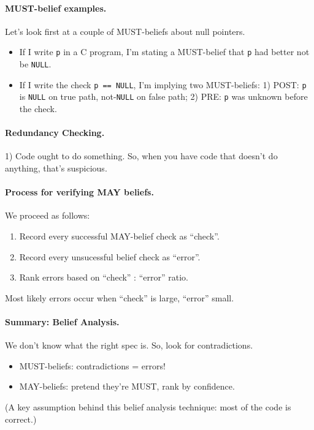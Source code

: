 \documentclass[11pt]{article}
\begin{document}
\paragraph{MUST-belief examples.} Let's look first at a couple of
MUST-beliefs about null pointers.

\begin{itemize}[noitemsep]
\item If I write {\tt *p} in a C program, I'm stating a MUST-belief that
  {\tt p} had better not be {\tt NULL}.
\item If I write the check {\tt p == NULL}, I'm implying two MUST-beliefs:
  1) POST: {\tt p} is {\tt NULL} on true path, not-{\tt NULL} on false path; 2) PRE:
  {\tt p} was unknown before the check.
\end{itemize}

\paragraph{Redundancy Checking.} 1) Code ought to do something. So,
when you have code that doesn't do anything, that's suspicious.

\paragraph{Process for verifying MAY beliefs.} We proceed as follows:
\begin{enumerate}[noitemsep]
\item    Record every successful MAY-belief check as ``check''.
\item    Record every unsucessful belief check as ``error''.
\item    Rank errors based on ``check'' : ``error'' ratio.
\end{enumerate}
Most likely errors occur when ``check'' is large, ``error'' small.

\paragraph{Summary: Belief Analysis.}
      We don't know what the right spec is.
      So, look for contradictions.

\begin{itemize}[noitemsep]
\item      MUST-beliefs: contradictions = errors!
\item      MAY-beliefs: pretend they're MUST, rank by confidence.
\end{itemize}
(A key assumption behind this belief analysis technique: most of the code is correct.)
\end{document}
